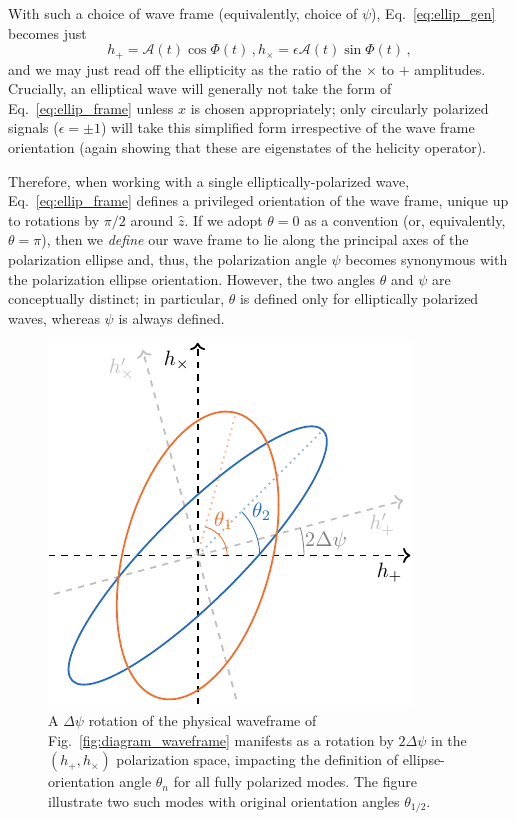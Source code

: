 \documentclass[aps,prd,twocolumn,superscriptaddress,preprintnumbers,floatfix,nofootinbib]{revtex4-2}
\newcommand{\beq}{\begin{equation}}
\newcommand{\eeq}{\end{equation}}
\newcommand*{\eq}[1]{Eq.~\eqref{eq:#1}}
\begin{document}
With such a choice of wave frame (equivalently, choice of $\psi$), \eq{ellip_gen} becomes just
\begin{subequations} \label{eq:ellip_frame}
\beq
h_+ = \mathcal{A}(t) \cos \Phi(t) \, ,
\eeq
\beq
h_\times = \epsilon \mathcal{A}(t) \sin \Phi(t)\, ,
\eeq
\end{subequations}
and we may just read off the ellipticity as the ratio of the $\times$ to $+$ amplitudes.
Crucially, an elliptical wave will generally not take the form of Eq.~\eqref{eq:ellip_frame} unless $\hat{x}$ is chosen appropriately; only circularly polarized signals ($\epsilon=\pm1$) will take  this simplified form irrespective of the wave frame orientation (again showing that these are eigenstates of the helicity operator).

Therefore, when working with a single elliptically-polarized wave, Eq.~\eqref{eq:ellip_frame} defines a privileged orientation of the wave frame, unique up to rotations by $\pi/2$ around $\hat{z}$.
If we adopt $\theta =0$ as a convention (or, equivalently, $\theta=\pi$), then we \emph{define} our wave frame to lie along the principal axes of the polarization ellipse and, thus, the polarization angle $\psi$ becomes synonymous with the polarization ellipse orientation.
However, the two angles $\theta$ and $\psi$ are conceptually distinct; in particular, $\theta$ is defined only for elliptically polarized waves, whereas $\psi$ is always defined.


\begin{figure}
\includegraphics[width=0.7\columnwidth]{diagram_ellipse_extra.pdf}
\caption{A $\Delta\psi$ rotation of the physical waveframe of Fig.~\ref{fig:diagram_waveframe} manifests as a rotation by $2\Delta\psi$ in the $(h_+,h_\times)$ polarization space, impacting the definition of ellipse-orientation angle $\theta_n$ for all fully polarized modes.
The figure illustrate two such modes with original orientation angles $\theta_{1/2}$.
}
\label{fig:diagram_ellipse_extra}
\end{figure}
\end{document}
